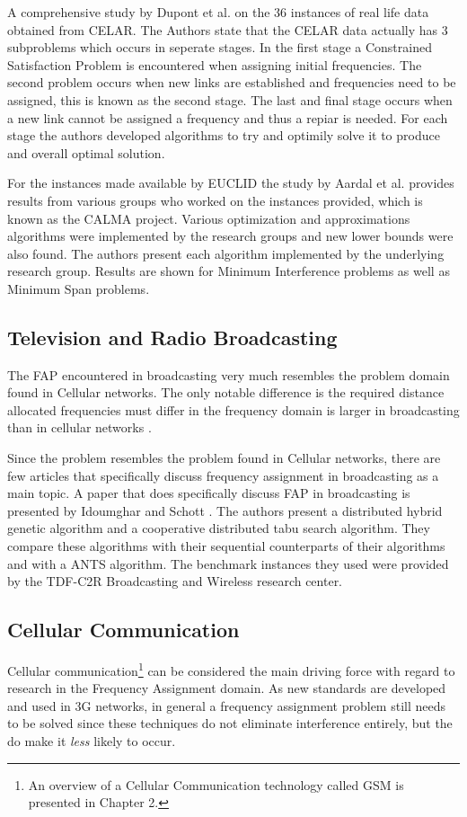 A comprehensive study by Dupont et al.\cite{DynamicFAP} on the 36 instances of real life data obtained from CELAR. The Authors state that the CELAR data actually has 3 subproblems which occurs in seperate stages. In the first stage a Constrained Satisfaction Problem is encountered when assigning initial frequencies. The second problem occurs when new links are established and frequencies need to be assigned, this is known as the second stage. The last and final stage occurs when a new link cannot be assigned a frequency and thus a repiar is needed. For each stage the authors developed algorithms to try and optimily solve it to produce and overall optimal solution.

For the instances made available by EUCLID the study by Aardal et al.\cite{CALMA} provides results from various groups who worked on the instances provided, which is known as the CALMA project. Various optimization and approximations algorithms were implemented by the research groups and new lower bounds were also found. The authors present each algorithm implemented by the underlying research group. Results are shown for Minimum Interference problems as well as Minimum Span problems.
\subsection{Television and Radio Broadcasting}
The FAP encountered in broadcasting very much resembles the problem domain found in Cellular networks. The only notable difference is the required distance allocated frequencies must differ in the frequency domain is larger in broadcasting than in cellular networks \cite{Karen2004}.

Since the problem resembles the problem found in Cellular networks, there are few articles that specifically discuss frequency assignment in broadcasting as a main topic. A paper that does specifically discuss FAP in broadcasting is presented by Idoumghar and Schott \cite{RadioFAP}. The authors present a distributed hybrid genetic algorithm and a cooperative distributed tabu search algorithm. They compare these algorithms with their sequential counterparts of their algorithms and with a ANTS algorithm. The benchmark instances they used were provided by the TDF-C2R Broadcasting and Wireless research center.
\subsection{Cellular Communication}
Cellular communication\footnote{An overview of a Cellular Communication technology called GSM is presented in Chapter 2.} can be considered the main driving force with regard to research in the Frequency Assignment domain. As new standards are developed and used in 3G networks, in general a frequency assignment problem still needs to be solved since these techniques do not eliminate interference entirely, but the do make it \emph{less} likely to occur.

